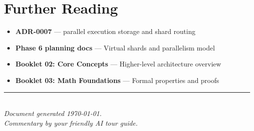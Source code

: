 \section*{Further Reading}

\begin{itemize}
  \item \textbf{ADR-0007} --- parallel execution storage and shard routing
  \item \textbf{Phase 6 planning docs} --- Virtual shards and parallelism model
  \item \textbf{Booklet 02: Core Concepts} --- Higher-level architecture overview
  \item \textbf{Booklet 03: Math Foundations} --- Formal properties and proofs
\end{itemize}

\vfill

\begin{center}
\rule{0.4\linewidth}{0.4pt}\\[6pt]
\textit{Document generated \today.}\\[2pt]
\textit{Commentary by your friendly AI tour guide.}
\end{center}

\clearpage
